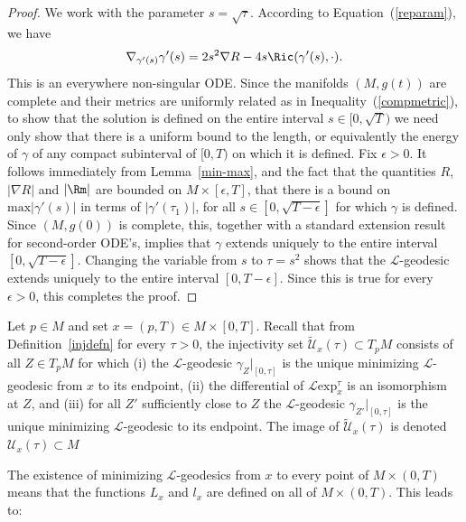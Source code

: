 \begin{proof}
We work with the parameter $s=\sqrt{\tau}$. According to
Equation~(\ref{reparam}), we have
$$\nabla_{\gamma'(s)}\gamma'(s)=2s^2\nabla
R-4s\Ric(\gamma'(s),\cdot).$$ This is an everywhere
non-singular ODE. Since the manifolds $(M,g(t))$ are complete and
their metrics are uniformly related as in
Inequality~(\ref{compmetric}), to show that the solution is defined
on the entire interval $s\in [0,\sqrt{T})$ we need only show that
there is a uniform bound to the length, or equivalently the energy
of $\gamma$ of any compact subinterval of $[0,T)$ on which it is
defined. Fix $\epsilon>0$. It follows immediately from
Lemma~\ref{min-max}, and the fact that the quantities $R$, $|\nabla
R|$ and $|\Rm|$ are bounded on $M\times [\epsilon,T]$, that
there is a bound on $\mathrm{max}|\gamma'(s)|$ in terms of
$|\gamma'(\tau_1)|$, for all $s\in [0,\sqrt{T-\epsilon}]$ for which
$\gamma$ is defined. Since $(M,g(0))$ is complete, this, together
with a standard extension result for second-order ODE's, implies
that $\gamma$ extends uniquely to the entire interval
$[0,\sqrt{T-\epsilon}]$. Changing the variable from $s$ to
$\tau=s^2$ shows that the ${\mathcal L}$-geodesic extends uniquely
to the entire interval $[0,T-\epsilon]$. Since this is true for
every $\epsilon>0$, this completes the proof.
\end{proof}

Let $p\in M$ and set $x=(p,T)\in M\times [0,T]$. Recall that from
Definition~\ref{injdefn} for every $\tau>0$, the injectivity set
$\widetilde{\mathcal U}_{x}(\tau)\subset T_pM$ consists of all $Z\in
T_pM$ for which (i) the ${\mathcal L}$-geodesic
$\gamma_Z|_{[0,\tau]}$ is the unique minimizing ${\mathcal
L}$-geodesic from $x$ to its endpoint, (ii) the differential of
${\mathcal L}\mathrm{exp}_{x}^\tau$ is an isomorphism at $Z$, and (iii)
for all  $Z'$ sufficiently close to
 $Z$ the ${\mathcal L}$-geodesic $\gamma_{Z'}|_{[0,\tau]}$ is the unique minimizing
 ${\mathcal L}$-geodesic to its endpoint. The image
of $\widetilde{\mathcal U}_{x}(\tau)$ is denoted ${\mathcal U}_{x}(\tau)\subset
M$




The existence of minimizing ${\mathcal L}$-geodesics from $x$ to
every point of $M\times (0,T)$ means that the functions $L_{x}$ and
$l_{x}$ are defined on all of $M\times (0,T)$. This leads to:

